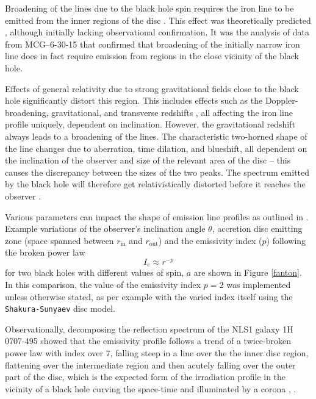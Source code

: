 \documentclass[fleqn,usenatbib,useAMS]{mnras}
\begin{document}
Broadening of the lines due to the black hole spin requires the iron line to be emitted from the inner regions of the disc \cite{laor2005line}. This effect was theoretically predicted \cite{stella1990measuring}, although initially lacking observational confirmation. It was the analysis of data from MCG--6-30-15 \cite{tanaka1995gravitationally} that confirmed that broadening of the initially narrow iron line does in fact require emission from regions in the close vicinity of the black hole.


Effects of general relativity due to strong gravitational fields close to the black hole significantly distort this region. This includes effects such as the Doppler-broadening, gravitational, and transverse redshifts \cite{fabian1989x}, all affecting the iron line profile uniquely, dependent on inclination. However, the gravitational redshift always leads to a broadening of the lines. The characteristic two-horned shape of the line changes due to aberration, time dilation, and blueshift, all dependent on the inclination of the observer and size of the relevant area of the disc -- this causes the discrepancy between the sizes of the two peaks. The spectrum emitted by the black hole will therefore get relativistically distorted before it reaches the observer \cite{dauser2016relativistic}. 

Various parameters can impact the shape of emission line profiles as outlined in \cite{fanton1997detecting}. Example variations of the observer's inclination angle $\theta$, accretion disc emitting zone (space spanned between $r_{\text{in}}$ and $r_{\text{out}}$) and the emissivity index ($p$) following the broken power law
%
\begin{equation}
    I_{e} \approx r^{-p}
    \label{intensity}
\end{equation}
%
for two black holes with different values of spin, $a$ are shown in Figure \ref{fanton}. In this comparison, the value of the emissivity index $p = 2$ was implemented unless otherwise stated, as per example with the varied index itself using the {\tt Shakura-Sunyaev} disc model.

Observationally, decomposing the reflection spectrum of the NLS1 galaxy 1H 0707-495 \cite{wilkins2011determination} showed that the emissivity profile follows a trend of a twice-broken power law with index over 7, falling steep in a line over the the inner disc region, flattening over the intermediate region and then acutely falling over the outer part of the disc, which is the expected form of the irradiation profile in the vicinity of a black hole curving the space-time and illuminated by a corona \cite{suebsuwong2006gravitational}, \cite{wilkins2015driving}.
\end{document}
